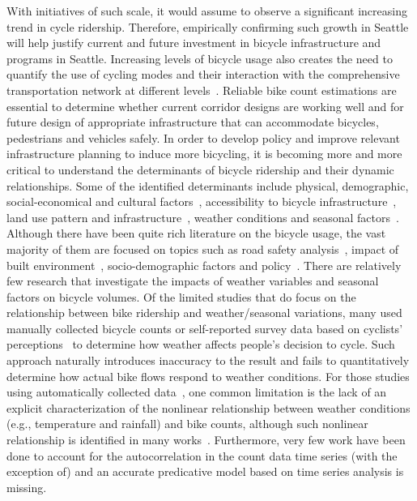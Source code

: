 \documentclass [11pt, proquest] {uwthesis}[2015/03/03]
\begin{document}
With initiatives of such scale, it would assume to observe a significant increasing trend in cycle ridership. Therefore, empirically confirming such growth in Seattle will help justify current and future investment in bicycle infrastructure and programs in Seattle. Increasing levels of bicycle usage also creates the need to quantify the use of cycling modes and their interaction with the comprehensive transportation network at different levels~\cite{MNResearch10}.  Reliable bike count estimations are essential to determine whether current corridor designs are working well and for future design of appropriate infrastructure that can accommodate bicycles, pedestrians and vehicles safely. In order to develop policy and improve relevant infrastructure planning to induce more bicycling, it is becoming more and more critical to understand the determinants of bicycle ridership and their dynamic relationships. Some of the identified determinants include physical, demographic, social-economical and cultural factors~\cite{Xing10,Pucher10,Krizek09}, accessibility to bicycle infrastructure~\cite{Voros07}, land use pattern and infrastructure~\cite{Dunlap15}, weather conditions and seasonal factors~\cite{Miranda-Moreno:2011aa,Rose:2011aa,Nosal:2014aa,Rose07}. Although there have been quite rich literature on the bicycle usage, the vast majority of them are focused on topics such as road safety analysis~\cite{Kim07}, impact of built environment~\cite{Pucher10}, socio-demographic factors and policy~\cite{Garrard08,Xing10}. There are relatively few research that investigate the impacts of weather variables and seasonal factors on bicycle volumes. Of the limited studies that do focus on the relationship between bike ridership and weather/seasonal variations, many used manually collected bicycle counts or self-reported survey data based on cyclists' perceptions~\cite{Nankervis99,Winters07,Richardson00,Richardson06} to determine how weather affects people's decision to cycle. Such approach naturally introduces inaccuracy to the result and fails to quantitatively determine how actual bike flows respond to weather conditions. For those studies using automatically collected data~\cite{Tin:2012aa,Nosal:2014aa}, one common limitation is the lack of an explicit characterization of the nonlinear relationship between weather conditions (e.g., temperature and rainfall) and bike counts, although such nonlinear relationship is identified in many works~\cite{Ahmed12,Miranda-Moreno:2011aa,Thomas12,Lewin:2011aa}. Furthermore, very few work have been done to account for the autocorrelation in the count data time series (with the exception of\cite{Gallop:2012aa,Nosal:2014aa}) and an accurate predicative model based on time series analysis is missing.
\end{document}
